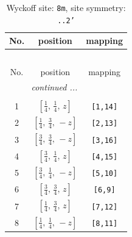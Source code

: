 \documentclass[fleqn,8pt]{jsarticle}
\begin{document}
\renewcommand{\arraystretch}{1.2}
\begin{longtable}{ccc}
\caption{Wyckoff site: {\tt 8m}, site symmetry: {\tt ..2'}}
 \\
 \hline \hline
No. & position & mapping \\ \hline \endfirsthead

\multicolumn{2}{l}{\tablename\ \thetable{}} \\
 \hline \hline
No. & position & mapping \\ \hline \endhead

 \hline \hline
\multicolumn{2}{r}{\footnotesize\it continued ...} \\ \endfoot

 \hline \hline
\multicolumn{2}{r}{} \\ \endlastfoot

1 & $\left[ \frac{1}{4},\, \frac{1}{4},\, z \right]$ & {\tt [1,14]} \\ \hline
2 & $\left[ \frac{1}{4},\, \frac{3}{4},\, - z \right]$ & {\tt [2,13]} \\ \hline
3 & $\left[ \frac{3}{4},\, \frac{3}{4},\, - z \right]$ & {\tt [3,16]} \\ \hline
4 & $\left[ \frac{3}{4},\, \frac{1}{4},\, z \right]$ & {\tt [4,15]} \\ \hline
5 & $\left[ \frac{3}{4},\, \frac{1}{4},\, - z \right]$ & {\tt [5,10]} \\ \hline
6 & $\left[ \frac{3}{4},\, \frac{3}{4},\, z \right]$ & {\tt [6,9]} \\ \hline
7 & $\left[ \frac{1}{4},\, \frac{3}{4},\, z \right]$ & {\tt [7,12]} \\ \hline
8 & $\left[ \frac{1}{4},\, \frac{1}{4},\, - z \right]$ & {\tt [8,11]} \\
\end{longtable}
\renewcommand{\arraystretch}{1.2}
\end{document}
